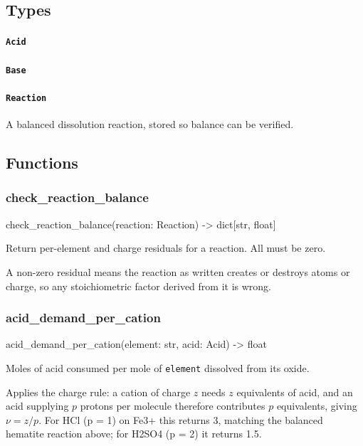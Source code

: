 \documentclass[10pt,a4paper,twoside]{report}
\begin{document}
\subsection*{Types}

\paragraph{\texttt{Acid}}

\paragraph{\texttt{Base}}

\paragraph{\texttt{Reaction}}

A balanced dissolution reaction, stored so balance can be verified.

\subsection*{Functions}

\subsubsection*{check\_reaction\_balance}

\begin{verbatimsmall}
check_reaction_balance(reaction: Reaction) -> dict[str, float]
\end{verbatimsmall}

Return per-element and charge residuals for a reaction. All must be zero.

A non-zero residual means the reaction as written creates or destroys atoms or charge, so any stoichiometric factor derived from it is wrong.

\subsubsection*{acid\_demand\_per\_cation}

\begin{verbatimsmall}
acid_demand_per_cation(element: str, acid: Acid) -> float
\end{verbatimsmall}

Moles of acid consumed per mole of \texttt{element} dissolved from its oxide.

Applies the charge rule: a cation of charge $z$ needs $z$ equivalents of acid, and an acid supplying $p$ protons per molecule therefore contributes $p$ equivalents, giving $\nu = z/p$. For HCl (p = 1) on Fe3+ this returns 3, matching the balanced hematite reaction above; for H2SO4 (p = 2) it returns 1.5.
\end{document}

